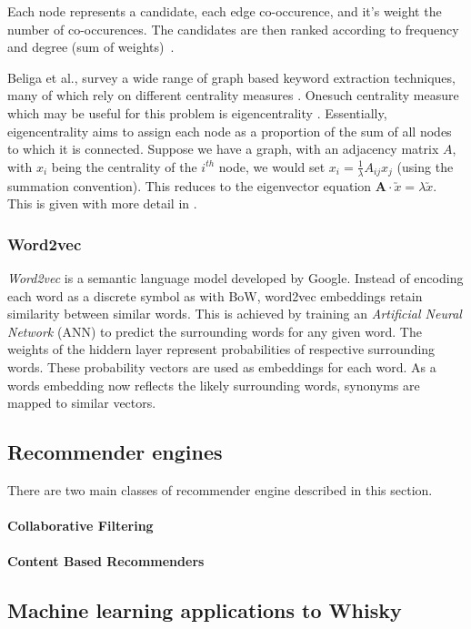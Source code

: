Each node represents a candidate, each edge co-occurence, and it's weight the number of co-occurences.  The 
candidates are then ranked according to frequency and degree (sum of weights)~\cite{Rose2010}.

Beliga et al., survey a wide range of graph based keyword extraction techniques, many of which rely on different 
centrality measures \cite{Beliga2015}. Onesuch centrality measure which may be useful for this problem is 
eigencentrality \cite{Bonacich2007}. Essentially, eigencentrality aims to assign each node as a proportion of the
sum of all nodes to which it is connected.  Suppose we have a graph, with an adjacency matrix $A$, with $x_i$ being
the centrality of the $i^{th}$ node, we would set $x_i = \frac{1}{\lambda}A_{ij}x_j$ (using the summation convention). This
reduces to the eigenvector equation $\textbf{A}\cdot \utilde{x} = \lambda \utilde{x}$. This is given with more detail in 
\cite{Newman2010}.

\subsubsection{Word2vec}\label{ssec:w2v}
\emph{Word2vec} is a semantic language model developed by Google.  Instead of encoding each word as a discrete symbol
as with BoW, word2vec embeddings retain similarity between similar words. This is achieved by training an \emph{Artificial 
Neural Network} (ANN) to predict the surrounding words for any given word.  The weights of the hiddern layer represent
probabilities of respective surrounding words. These probability vectors are used as embeddings for each word. As a words
embedding now reflects the likely surrounding words, synonyms are mapped to similar vectors.
\cite{Mikolov2013, McCormick2017, Liu2020}

\subsection{Recommender engines}\label{ssec:recommenders}
There are two main classes of recommender engine described in this section.
\paragraph{Collaborative Filtering}
\paragraph{Content Based Recommenders}

\subsection{Machine learning applications to Whisky}\label{ssec:ml2whisk}


